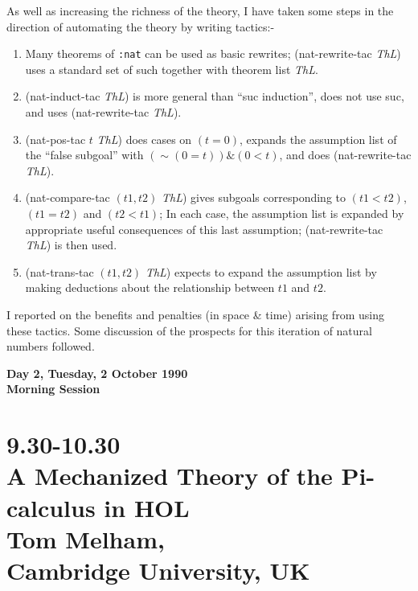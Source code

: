 As well as increasing the richness of the theory, I have taken some steps
in the direction of automating the theory by writing tactics:-
\begin{enumerate}
\item Many theorems of {\tt :nat} can be used as basic rewrites;
   ({\sc nat-rewrite-tac} {\it ThL}) uses a standard set of such
   together with theorem list {\it ThL}.
\item ({\sc nat-induct-tac}  {\it ThL}) is more general than
  ``{\sc suc} induction'', does not use {\sc suc}, and uses
  ({\sc nat-rewrite-tac} {\it ThL}). 
\item ({\sc nat-pos-tac} $t$ {\it ThL}) does cases on $ (t=0)$,
   expands the assumption list of
   the ``false subgoal'' with $ (\sim(0=t)) \& (0<t) $, and does
   ({\sc nat-rewrite-tac} {\it ThL}).
\item ({\sc nat-compare-tac} $(t1,t2)$ {\it ThL}) gives subgoals
   corresponding to $(t1<t2)$, $(t1=t2)$ and $ (t2<t1) $; In each case,
   the assumption list is expanded by appropriate useful consequences of
   this last assumption; ({\sc nat-rewrite-tac} {\it ThL}) is then used.
\item ({\sc nat-trans-tac} $(t1,t2)$ {\it ThL}) expects to expand the
   assumption list by making deductions about the relationship between
   $t1$ and $t2$. 
\end{enumerate}

I reported on the benefits and penalties (in space \& time) arising from
using these tactics.  Some discussion of the prospects for this iteration
of natural numbers followed.


\newpage
\begin{center}\Large\bf
Day 2, Tuesday, 2 October 1990\\
Morning Session 
\end{center}

\section*{9.30-10.30\\
A Mechanized Theory of the Pi-calculus in HOL\\
Tom Melham,\\
\large\bf Cambridge University, UK}

\def\HOL{{\small HOL}}
\def\ML{{\small ML}}

